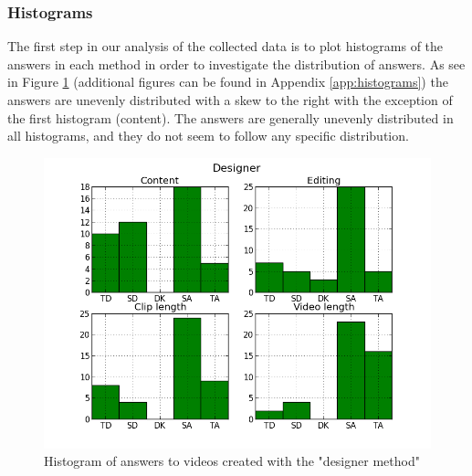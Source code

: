 \subsubsection{Histograms}
%
The first step in our analysis of the collected data is to plot histograms of the answers in each method in order to investigate the distribution of answers. As see in Figure \ref{fig:hist_design} (additional figures can be found in Appendix \ref{app:histograms}) the answers are unevenly distributed with a skew to the right with the exception of the first histogram (content). The answers are generally unevenly distributed in all histograms, and they do not seem to follow any specific distribution. %
%
\begin{figure}
     \centering
     \includegraphics[width=1.0\textwidth]{img/designer_barplot.png}
     \caption{Histogram of answers to videos created with the "designer method"}\label{fig:hist_design}
\end{figure}\\
%
